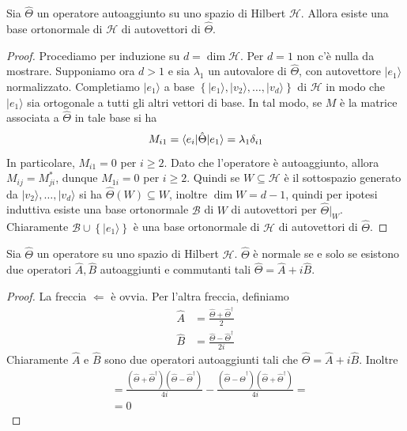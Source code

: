 \documentclass[a4paper, 11pt]{article}
\renewcommand{\H}{\mathcal{H}}
\renewcommand{\ket}[1]{| #1\rangle}
\begin{document}
\begin{theorem}
	Sia $\hat{\Theta}$ un operatore autoaggiunto su uno spazio di Hilbert $\H$. Allora esiste una base ortonormale di $\H$ di autovettori di $\hat{\Theta}$.
\end{theorem}
\begin{proof}
	Procediamo per induzione su $d=\dim\H$. Per $d=1$ non c'è nulla da mostrare. Supponiamo ora $d>1$ e sia $\lambda_1$ un autovalore di $\hat{\Theta}$, con autovettore $\ket{e_1}$ normalizzato. Completiamo $\ket{e_1}$ a base $\left\{\ket{e_1},\ket{v_2},\dots,\ket{v_d}\right\}$ di $\H$ in modo che $\ket{e_1}$ sia ortogonale a tutti gli altri vettori di base. In tal modo, se $M$ è la matrice associata a $\hat{\Theta}$ in tale base si ha
	\[M_{i1}=\langle e_i|\hat{\Theta}|e_1\rangle=\lambda_1\delta_{i1}\]
	In particolare, $M_{i1}=0$ per $i\geq2$. Dato che l'operatore è autoaggiunto, allora $M_{ij}=M_{ji}^*$, dunque $M_{1i}=0$ per $i\geq2$. Quindi se $W\subseteq\H$ è il sottospazio generato da $\ket{v_2},\dots,\ket{v_d}$ si ha $\hat{\Theta}(W)\subseteq W$, inoltre $\dim W=d-1$, quindi per ipotesi induttiva esiste una base ortonormale $\mathcal{B}$ di $W$ di autovettori per $\hat{\Theta}|_{W}$. Chiaramente $\mathcal{B}\cup\left\{\ket{e_1}\right\}$ è una base ortonormale di $\H$ di autovettori di $\hat{\Theta}$.
\end{proof}
\begin{lemma}
	Sia $\hat{\Theta}$ un operatore su uno spazio di Hilbert $\H$. $\hat{\Theta}$ è normale se e solo se esistono due operatori $\hat{A},\hat{B}$ autoaggiunti e commutanti tali $\hat{\Theta}=\hat{A}+i\hat{B}$.
\end{lemma}
\begin{proof}
	La freccia $\Leftarrow$ è ovvia. Per l'altra freccia, definiamo
	\begin{align*}
		\hat{A}&=\frac{\hat{\Theta}+\hat{\Theta}^\dagger}{2}\\
		\hat{B}&=\frac{\hat{\Theta}-\hat{\Theta}^\dagger}{2i}
	\end{align*}
	Chiaramente $\hat{A}$ e $\hat{B}$ sono due operatori autoaggiunti tali che $\hat{\Theta}=\hat{A}+i\hat{B}$. Inoltre
	\begin{align*}
		[\hat{A},\hat{B}]&=\frac{(\hat{\Theta}+\hat{\Theta}^\dagger)(\hat{\Theta}-\hat{\Theta}^\dagger)}{4i}-\frac{(\hat{\Theta}-\hat{\Theta}^\dagger)(\hat{\Theta}+\hat{\Theta}^\dagger)}{4i}=\\&=0
	\end{align*}
\end{proof}
\end{document}
